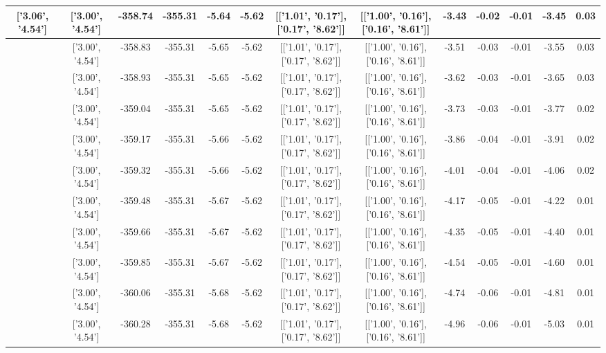 \begin{table}[htbp]
\begin{adjustbox}{angle=90}
\begin{tabular}{|c|c|c|c|c|c|c|c|c|c|c|c|c|}
 ['3.06', '4.54'] & ['3.00', '4.54'] & -358.74 & -355.31 & -5.64 & -5.62 & [['1.01', '0.17'], ['0.17', '8.62']] & [['1.00', '0.16'], ['0.16', '8.61']] & -3.43 & -0.02 & -0.01 & -3.45 & 0.03\\ \hline
 ['3.07', '4.54'] & ['3.00', '4.54'] & -358.83 & -355.31 & -5.65 & -5.62 & [['1.01', '0.17'], ['0.17', '8.62']] & [['1.00', '0.16'], ['0.16', '8.61']] & -3.51 & -0.03 & -0.01 & -3.55 & 0.03\\ \hline
 ['3.09', '4.54'] & ['3.00', '4.54'] & -358.93 & -355.31 & -5.65 & -5.62 & [['1.01', '0.17'], ['0.17', '8.62']] & [['1.00', '0.16'], ['0.16', '8.61']] & -3.62 & -0.03 & -0.01 & -3.65 & 0.03\\ \hline
 ['3.10', '4.54'] & ['3.00', '4.54'] & -359.04 & -355.31 & -5.65 & -5.62 & [['1.01', '0.17'], ['0.17', '8.62']] & [['1.00', '0.16'], ['0.16', '8.61']] & -3.73 & -0.03 & -0.01 & -3.77 & 0.02\\ \hline
 ['3.11', '4.55'] & ['3.00', '4.54'] & -359.17 & -355.31 & -5.66 & -5.62 & [['1.01', '0.17'], ['0.17', '8.62']] & [['1.00', '0.16'], ['0.16', '8.61']] & -3.86 & -0.04 & -0.01 & -3.91 & 0.02\\ \hline
 ['3.12', '4.55'] & ['3.00', '4.54'] & -359.32 & -355.31 & -5.66 & -5.62 & [['1.01', '0.17'], ['0.17', '8.62']] & [['1.00', '0.16'], ['0.16', '8.61']] & -4.01 & -0.04 & -0.01 & -4.06 & 0.02\\ \hline
 ['3.13', '4.55'] & ['3.00', '4.54'] & -359.48 & -355.31 & -5.67 & -5.62 & [['1.01', '0.17'], ['0.17', '8.62']] & [['1.00', '0.16'], ['0.16', '8.61']] & -4.17 & -0.05 & -0.01 & -4.22 & 0.01\\ \hline
 ['3.15', '4.55'] & ['3.00', '4.54'] & -359.66 & -355.31 & -5.67 & -5.62 & [['1.01', '0.17'], ['0.17', '8.62']] & [['1.00', '0.16'], ['0.16', '8.61']] & -4.35 & -0.05 & -0.01 & -4.40 & 0.01\\ \hline
 ['3.16', '4.55'] & ['3.00', '4.54'] & -359.85 & -355.31 & -5.67 & -5.62 & [['1.01', '0.17'], ['0.17', '8.62']] & [['1.00', '0.16'], ['0.16', '8.61']] & -4.54 & -0.05 & -0.01 & -4.60 & 0.01\\ \hline
 ['3.17', '4.55'] & ['3.00', '4.54'] & -360.06 & -355.31 & -5.68 & -5.62 & [['1.01', '0.17'], ['0.17', '8.62']] & [['1.00', '0.16'], ['0.16', '8.61']] & -4.74 & -0.06 & -0.01 & -4.81 & 0.01\\ \hline
 ['3.18', '4.55'] & ['3.00', '4.54'] & -360.28 & -355.31 & -5.68 & -5.62 & [['1.01', '0.17'], ['0.17', '8.62']] & [['1.00', '0.16'], ['0.16', '8.61']] & -4.96 & -0.06 & -0.01 & -5.03 & 0.01\\ \hline

\end{tabular}
\end{adjustbox}
\end{table}
